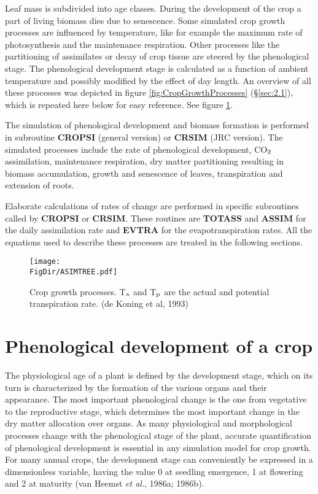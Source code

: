 Leaf mass is subdivided into age classes. During the development of the crop a part of
living biomass dies due to senescence. Some simulated crop growth processes are
influenced by temperature, like for example the maximum rate of photosynthesis and the
maintenance respiration. Other processes like the partitioning of assimilates or decay of
crop tissue are steered by the phenological stage. The phenological development stage is
calculated as a function of ambient temperature and possibly modified by the effect of day
length. An overview of all these processes was depicted in figure \ref{fig:CropGrowthProcesses} 
(\S \ref{sec:2.1}), which is repeated here below for easy reference. See figure \ref{fig:CropGrowthProc2}.

The simulation of phenological development and biomass formation is performed in
subroutine {\bf CROPSI} (general version) or {\bf CRSIM} (JRC version). The simulated processes
include the rate of phenological development, CO$_{{\rm 2}}$ assimilation, maintenance respiration,
dry matter partitioning resulting in biomass accumulation, growth and senescence of
leaves, transpiration and extension of roots. 

Elaborate calculations of rates of change are performed in specific subroutines called by
{\bf CROPSI} or {\bf CRSIM}. These routines are {\bf TOTASS} and {\bf ASSIM} for the daily assimilation
rate and {\bf EVTRA} for the evapotranspiration rates. All the equations used to describe these
processes are treated in the following sections.

\begin{figure}[p]
\centering
\texttt{[image: \\FigDir/ASIMTREE.pdf]}
\caption{Crop growth processes. \small T$_{{\rm a}}$ and T$_{{\rm p}}$ are the actual and potential 
transpiration rate. (de Koning et al, 1993)}
\label{fig:CropGrowthProc2}
\end{figure}

\section{Phenological development of a crop}

The physiological age of a plant is defined by the development stage, which on its turn is
characterized by the formation of the various organs and their appearance. The most
important phenological change is the one from vegetative to the reproductive stage, which
determines the most important change in the dry matter allocation over organs. As many
physiological and morphological processes change with the phenological stage of the
plant, accurate quantification of phenological development is essential in any simulation
model for crop growth. For many annual crops, the development stage can conveniently
be expressed in a dimensionless variable, having the value 0 at seedling emergence, 1 at
flowering and 2 at maturity (van Heemst {\it et al.}, 1986a; 1986b). 

